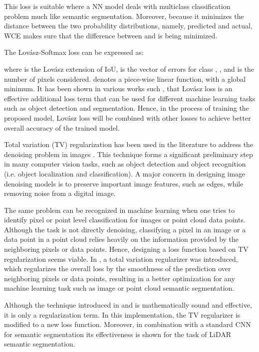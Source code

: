 \documentclass{article}
\begin{document}
This loss is suitable where a NN model deals with multiclass classification problem much like semantic segmentation. Moreover, because it minimizes the distance between the two probability distributions, namely, predicted and actual, WCE makes sure that the difference between  and  is being minimized.

The Lov\'asz-Softmax loss \cite{berman2018lovasz} can be expressed as:

\vspace{-1mm}


\noindent where  is the Lov\'asz extension of IoU,  is the vector of errors for class , , and  is the number of pixels considered.  denotes a piece-wise linear function, with a global minimum. It has been shown in various works such \cite{rezatofighi2019generalized,cortinhal2020salsanext}, that Lov\'asz loss is an effective additional loss term that can be used for different machine learning tasks such as object detection and segmentation. Hence, in the process of training the proposed model, Lov\'asz loss will be combined with other losses to achieve better overall accuracy of the trained model. 

Total variation (TV) regularization has been used in the literature to address the denoising problem in images \cite{chen2010adaptive, chan2005recent}. This technique forms a significant preliminary step in many computer vision tasks, such as object detection and object recognition (i.e. object localization and classification). A major concern in designing image denoising models is to preserve important image features, such as edges, while removing noise from a digital image.

The same problem can be recognized in machine learning when one tries to identify pixel or point level classification for images or point cloud data points. Although the task is not directly denoising, classifying a pixel in an image or a data point in a point cloud relies heavily on the information provided by the neighboring pixels or data points. Hence, designing a loss function based on TV regularization seems viable. In \cite{rudin1992nonlinear}, a total variation regularizer was introduced, which regularizes the overall loss by the smoothness of the prediction over neighboring pixels or data points, resulting in a better optimization for any machine learning task such as image or point cloud semantic segmentation.

Although the technique introduced in \cite{rudin1992nonlinear} and \cite{mahendran2015understanding} is mathematically sound and effective, it is only a regularization term. In this implementation, the TV regularizer is modified to a new loss function. Moreover, in combination with a standard CNN for semantic segmentation its effectiveness is shown for the task of LiDAR semantic segmentation.
\end{document}
